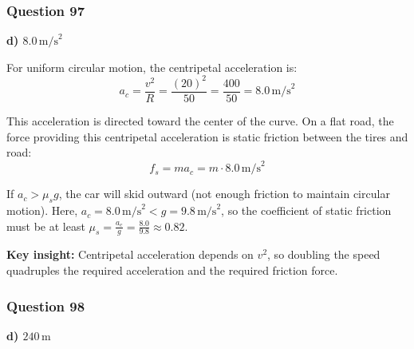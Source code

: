 \documentclass[12pt,letterpaper]{article}
\begin{document}
\subsubsection*{Question 97}

\begin{answerbox}
\textbf{d) $8.0\,\text{m/s}^2$}
\end{answerbox}

\begin{explanationbox}
For uniform circular motion, the centripetal acceleration is:
\[
a_c = \frac{v^2}{R} = \frac{(20)^2}{50} = \frac{400}{50} = 8.0\,\text{m/s}^2
\]

This acceleration is directed toward the center of the curve. On a flat road, the force providing this centripetal acceleration is static friction between the tires and road:
\[
f_s = ma_c = m \cdot 8.0\,\text{m/s}^2
\]

If $a_c > \mu_s g$, the car will skid outward (not enough friction to maintain circular motion). Here, $a_c = 8.0\,\text{m/s}^2 < g = 9.8\,\text{m/s}^2$, so the coefficient of static friction must be at least $\mu_s = \frac{a_c}{g} = \frac{8.0}{9.8} \approx 0.82$.

\textbf{Key insight:} Centripetal acceleration depends on $v^2$, so doubling the speed quadruples the required acceleration and the required friction force.
\end{explanationbox}

\subsubsection*{Question 98}

\begin{answerbox}
\textbf{d) $240\,\text{m}$}
\end{answerbox}
\end{document}
